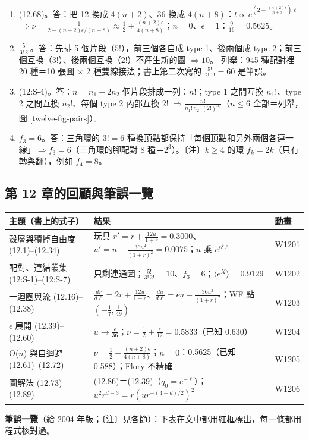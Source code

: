 {\begin{enumerate}[label=\textbf{12.\arabic*},itemsep=0.05em]
\item (12.68)。\quad 答：把 12 換成 $4(n+2)$、36 換成 $4(n+8)$：$t\propto e^{(2-\frac{(n+2)\epsilon}{n+8})\ell}$ $\Rightarrow\nu=\frac1{2-(n+2)\epsilon/(n+8)}\approx\frac12+\frac{(n+2)\epsilon}{4(n+8)}$；$n=0$、$\epsilon=1$：$\frac9{16}=0.5625$。
\item $\frac{5!}{3!\,2!}$。\quad 答：先排 5 個片段（$5!$），前三個各自成 type 1、後兩個成 type 2；前三個互換（$3!$）、後兩個互換（$2!$）不產生新的圖 $\Rightarrow10$。
列舉：945 種配對裡 20 種＝10 張圖 $\times$ 2 種雙線接法；書上第二次寫的 $\frac{5!}{2!\,1!}=60$ 是筆誤。
\item (12:S-4)。\quad 答：$n=n_1+2n_2$ 個片段排成一列：$n!$；type 1 之間互換 $n_1!$、type 2 之間互換 $n_2!$、每個 type 2 內部互換 $2!$ $\Rightarrow\frac{n!}{n_1!\,n_2!\,(2!)^{n_2}}$（$n\le6$ 全部＝列舉，圖 \ref{twelve-fig-pairs}）。
\item $f_3=6$。\quad 答：三角環的 $3!=6$ 種換頂點都保持「每個頂點和另外兩個各連一線」$\Rightarrow f_3=6$（三角環的腳配對 8 種＝$2^3$）。〔注〕$k\ge4$ 的環 $f_k=2k$（只有轉與翻），例如 $f_4=8$。
\end{enumerate}}

\subsection{第 12 章的回顧與筆誤一覽}
\begin{center}
\footnotesize\setlength{\tabcolsep}{4pt}
\begin{tabular}{@{}lll@{}}
\toprule
主題（書上的式子） & 結果 & 動畫\\
\midrule
殼層與積掉自由度 (12.1)--(12.34) & 玩具 $r'=r+\frac{12u}{1+r}=0.3000$、$u'=u-\frac{36u^2}{(1+r)^2}=0.0075$；$u$ 乘 $e^{\epsilon\delta\ell}$ & W1201\\
配對、連結叢集 (12:S-1)--(12:S-7) & 只剩連通圖；$\frac{5!}{3!\,2!}=10$、$f_3=6$；$\langle e^X\rangle=0.9129$ & W1202\\
一迴圈與流 (12.16)--(12.38) & $\frac{dr}{d\ell}=2r+\frac{12u}{1+r}$、$\frac{du}{d\ell}=\epsilon u-\frac{36u^2}{(1+r)^2}$；WF 點 $(-\frac17,\frac1{49})$ & W1203\\
$\epsilon$ 展開 (12.39)--(12.60) & $u\to\frac\epsilon{36}$；$\nu=\frac12+\frac\epsilon{12}=0.5833$（已知 0.630） & W1204\\
O($n$) 與自迴避 (12.61)--(12.72) & $\nu=\frac12+\frac{(n+2)\epsilon}{4(n+8)}$；$n=0$：0.5625（已知 0.588）；Flory 不精確 & W1205\\
圖解法 (12.73)--(12.89) & (12.86)＝(12.39)（$q_0=e^{-\ell}$）；$u^2r^{d-3}=r(ur^{-(4-d)/2})^2$ & W1206\\
\bottomrule
\end{tabular}
\end{center}
\textbf{筆誤一覽}（給 2004 年版；〔注〕見各節）：下表在文中都用紅框標出，每一條都用程式核對過。
\begin{center}
\footnotesize\renewcommand{\arraystretch}{0.9}
\TwelveTabErrata
\end{center}

